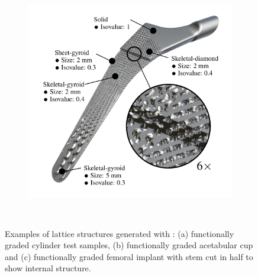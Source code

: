 \begin{figure}[htb]
{\begin{subfigure}[t]{.58\linewidth}
		\includegraphics[width=\linewidth]{figures/femoral_implant.png}
		\caption{}\label{fig:femoral implat}
	\end{subfigure}}
	
	\centering
	\begin{minipage}{.35\textwidth}
		 \\
	\end{minipage}%
	\begin{minipage}{.58\textwidth}
	\end{minipage}

	\caption{Examples of lattice structures generated with \asli{}: (a) functionally graded cylinder test samples, (b) functionally graded acetabular cup and (c) functionally graded femoral implant with stem cut in half to show internal structure.}
	\label{fig:examples}
\end{figure}